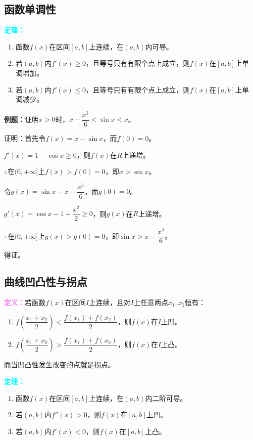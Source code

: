 \documentclass[UTF8, 12pt]{ctexart}
\begin{document}
\subsection{函数单调性}

\textcolor{aqua}{\textbf{定理：}}

\begin{enumerate}
    \item 函数$f(x)$在区间$[a,b]$上连续，在$(a,b)$内可导。
    \item 若$(a,b)$内$f'(x)\geqslant 0$，且等号只有有限个点上成立，则$f(x)$在$[a,b]$上单调增加。
    \item 若$(a,b)$内$f'(x)\leqslant 0$，且等号只有有限个点上成立，则$f(x)$在$[a,b]$上单调减少。
\end{enumerate}

\textbf{例题：}证明$x>0$时，$x-\dfrac{x^3}{6}<\sin x<x$。

证明：首先令$f(x)=x-\sin x$，而$f(0)=0$。

$f'(x)=1-\cos x\geqslant 0$，则$f(x)$在$R$上递增。

$\therefore$在$(0,+\infty]$上$f(x)>f(0)=0$，即$x>\sin x$。

令$g(x)=\sin x-x-\dfrac{x^3}{6}$，而$g(0)=0$。

$g'(x)=\cos x-1+\dfrac{x^2}{2}\geqslant 0$，则$g(x)$在$R$上递增。

$\therefore$在$(0,+\infty]$上$g(x)>g(0)=0$，即$\sin x>x-\dfrac{x^3}{6}$。

得证。

\subsection{曲线凹凸性与拐点}

\textcolor{violet}{\textbf{定义：}}若函数$f(x)$在区间$I$上连续，且对$I$上任意两点$x_1,x_2$恒有：

\begin{enumerate}
    \item $f(\dfrac{x_1+x_2}{2})<\dfrac{f(x_1)+f(x_2)}{2}$，则$f(x)$在$I$上凹。
    \item $f(\dfrac{x_1+x_2}{2})>\dfrac{f(x_1)+f(x_2)}{2}$，则$f(x)$在$I$上凸。
\end{enumerate}

而当凹凸性发生改变的点就是拐点。

\textcolor{aqua}{\textbf{定理：}}

\begin{enumerate}
    \item 函数$f(x)$在区间$[a,b]$上连续，在$(a,b)$内二阶可导。
    \item 若$(a,b)$内$f''(x)>0$，则$f(x)$在$[a,b]$上凹。
    \item 若$(a,b)$内$f'(x)<0$，则$f(x)$在$[a,b]$上凸。
\end{enumerate}
\end{document}

